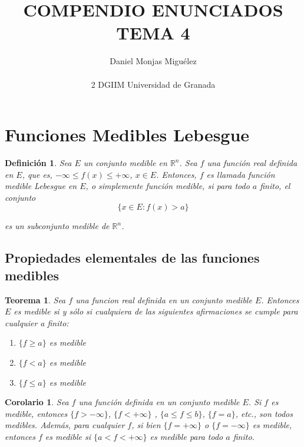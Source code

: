 \documentclass{article}
\author{Daniel Monjas Migu\'elez 
 		\\ \\ 2 DGIIM Universidad de Granada}
\title{COMPENDIO ENUNCIADOS TEMA 4}
\newtheorem{theorem}{Teorema}
\newtheorem{corollary}{Corolario}
\newtheorem{definition}{Definición}
\begin{document}
\maketitle

\newpage

\section{Funciones Medibles Lebesgue}
\begin{definition}
Sea $E$ un conjunto medible en $\mathbb{R}^n$. Sea $f$ una función real definida en $E$, que es, $-\infty \leq f(x) \leq +\infty$, $x \in E$. Entonces, $f$ es llamada función medible Lebesgue en $E$, o simplemente función medible, si para todo $a$ finito, el conjunto
\begin{equation}
\{x \in E : f(x) > a\}
\end{equation}

es un subconjunto medible de $\mathbb{R}^n$.
\end{definition}

\subsection{Propiedades elementales de las funciones medibles}

\begin{theorem}
Sea $f$ una funcion real definida en un conjunto medible $E$. Entonces $E$ es medible si y sólo si cualquiera de las siguientes afirmaciones se cumple para cualquier a finito:

\begin{enumerate}[label=(\roman*)]

\item $\{f \geq a\}$ \textit{es medible}
\item $\{f < a\}$ \textit{es medible}
\item $\{f \leq a\}$ \textit{es medible}

\end{enumerate}
\end{theorem}

\begin{corollary}
Sea $f$ una función definida en un conjunto medible $E$. Si $f$ es medible, entonces $\{f > -\infty\}$, $\{f < +\infty\}$ , $\{a \leq f \leq b\}$, $\{f = a\}$, etc., son todos medibles. Además, para cualquier $f$, si bien $\{f = +\infty\}$ o $\{f = -\infty\}$ es medible, entonces $f$ es medible si $\{a < f < +\infty\}$ es medible para todo $a$ finito.
\end{corollary}
\end{document}
